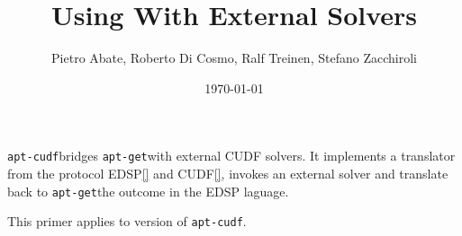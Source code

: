 \documentclass{article}
\title{Using \aptget{} With External Solvers}
\author{Pietro Abate, Roberto Di Cosmo, Ralf Treinen, Stefano Zacchiroli}
\date{\today}
\newcommand{\aptget}{\texttt{apt-get}}
\newcommand{\aptcudf}{\texttt{apt-cudf}}
\begin{document}
\aptcudf bridges \aptget with external CUDF solvers. It implements a translator
from the protocol EDSP\ref{} and CUDF\ref{}, invokes an external solver and
translate back to \aptget the outcome in the EDSP laguage.

This primer applies to version \version{} of \aptcudf.

\maketitle

\tableofcontents







\end{document}
